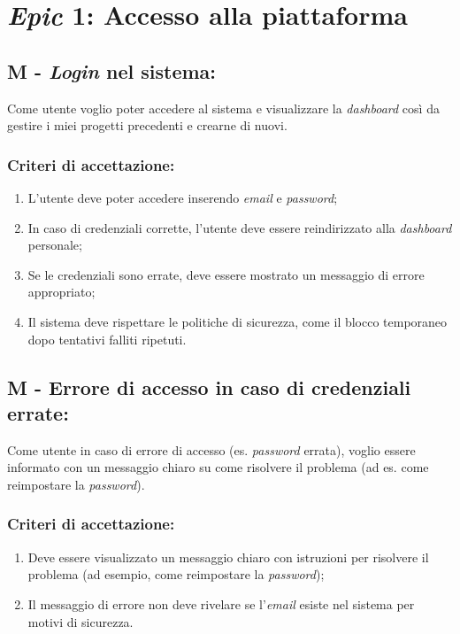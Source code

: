 \vspace{0.5cm}
\section*{\textit{Epic} 1: Accesso alla piattaforma}

\subsection*{\textbf{M} - \textit{Login} nel sistema:}

\noindent Come utente voglio poter accedere al sistema e visualizzare la \textit{dashboard} così da gestire i miei progetti precedenti e crearne di nuovi. 

\subsubsection*{Criteri di accettazione:}

\begin{enumerate}
    \item L'utente deve poter accedere inserendo \textit{email} e \textit{password};
    \item In caso di credenziali corrette, l'utente deve essere reindirizzato alla \textit{dashboard} personale;
    \item Se le credenziali sono errate, deve essere mostrato un messaggio di errore appropriato;
    \item Il sistema deve rispettare le politiche di sicurezza, come il blocco temporaneo dopo tentativi falliti ripetuti.
\end{enumerate}

\vspace{0.5cm}

\subsection*{M - Errore di accesso in caso di credenziali errate:}

\noindent Come utente in caso di errore di accesso (es. \textit{password} errata), voglio essere informato con un messaggio chiaro su come risolvere il problema (ad es. come reimpostare la \textit{password}).

\subsubsection*{Criteri di accettazione:}

\begin{enumerate}
    \item Deve essere visualizzato un messaggio chiaro con istruzioni per risolvere il problema (ad esempio, come reimpostare la \textit{password});
    \item Il messaggio di errore non deve rivelare se l'\textit{email} esiste nel sistema per motivi di sicurezza.
\end{enumerate}

